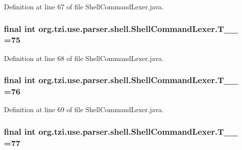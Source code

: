 Definition at line 67 of file Shell\-Command\-Lexer.\-java.

\hypertarget{classorg_1_1tzi_1_1use_1_1parser_1_1shell_1_1_shell_command_lexer_ad3f0f15f6efc62811cf294698535d48e}{
\subsubsection[{T\-\_\-\-\_\-75}]{\setlength{\rightskip}{0pt plus 5cm}final int org.\-tzi.\-use.\-parser.\-shell.\-Shell\-Command\-Lexer.\-T\-\_\-\-\_ =75\hspace{0.3cm}{\ttfamily [static]}}}\label{classorg_1_1tzi_1_1use_1_1parser_1_1shell_1_1_shell_command_lexer_ad3f0f15f6efc62811cf294698535d48e}


Definition at line 68 of file Shell\-Command\-Lexer.\-java.

\hypertarget{classorg_1_1tzi_1_1use_1_1parser_1_1shell_1_1_shell_command_lexer_ac702aca4de4cadc36e72d8fc3bfdd6ef}{
\subsubsection[{T\-\_\-\-\_\-76}]{\setlength{\rightskip}{0pt plus 5cm}final int org.\-tzi.\-use.\-parser.\-shell.\-Shell\-Command\-Lexer.\-T\-\_\-\-\_ =76\hspace{0.3cm}{\ttfamily [static]}}}\label{classorg_1_1tzi_1_1use_1_1parser_1_1shell_1_1_shell_command_lexer_ac702aca4de4cadc36e72d8fc3bfdd6ef}


Definition at line 69 of file Shell\-Command\-Lexer.\-java.

\hypertarget{classorg_1_1tzi_1_1use_1_1parser_1_1shell_1_1_shell_command_lexer_afbf0ef1d1f58be31d8a0c93918e8ea84}{
\subsubsection[{T\-\_\-\-\_\-77}]{\setlength{\rightskip}{0pt plus 5cm}final int org.\-tzi.\-use.\-parser.\-shell.\-Shell\-Command\-Lexer.\-T\-\_\-\-\_ =77\hspace{0.3cm}{\ttfamily [static]}}}\label{classorg_1_1tzi_1_1use_1_1parser_1_1shell_1_1_shell_command_lexer_afbf0ef1d1f58be31d8a0c93918e8ea84}


